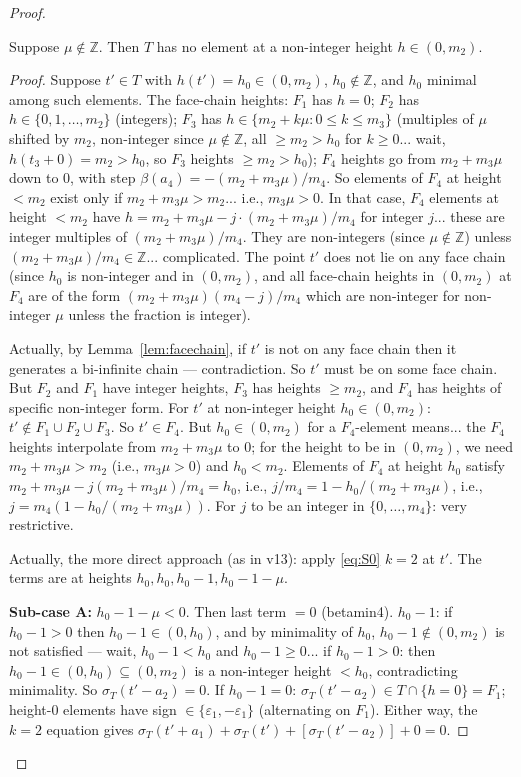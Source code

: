 \begin{proof}
\begin{lemma}[nogaps]\label{lem:nogaps}
Suppose $\mu \notin \mathbb{Z}$. Then $T$ has no element at a non-integer height $h \in (0, m_2)$.
\end{lemma}
\begin{proof}
Suppose $t' \in T$ with $h(t') = h_0 \in (0,m_2)$, $h_0 \notin \mathbb{Z}$, and $h_0$ minimal among such elements. The face-chain heights: $F_1$ has $h=0$; $F_2$ has $h \in \{0,1,\ldots,m_2\}$ (integers); $F_3$ has $h \in \{m_2+k\mu : 0 \leq k \leq m_3\}$ (multiples of $\mu$ shifted by $m_2$, non-integer since $\mu \notin \mathbb{Z}$, all $\geq m_2 > h_0$ for $k \geq 0$... wait, $h(t_3+0)=m_2>h_0$, so $F_3$ heights $\geq m_2 > h_0$); $F_4$ heights go from $m_2+m_3\mu$ down to $0$, with step $\beta(a_4) = -(m_2+m_3\mu)/m_4$. So elements of $F_4$ at height $< m_2$ exist only if $m_2+m_3\mu > m_2$... i.e., $m_3\mu > 0$. In that case, $F_4$ elements at height $< m_2$ have $h = m_2+m_3\mu - j \cdot (m_2+m_3\mu)/m_4$ for integer $j$... these are integer multiples of $(m_2+m_3\mu)/m_4$. They are non-integers (since $\mu \notin \mathbb{Z}$) unless $(m_2+m_3\mu)/m_4 \in \mathbb{Z}$... complicated. The point $t'$ does not lie on any face chain (since $h_0$ is non-integer and in $(0,m_2)$, and all face-chain heights in $(0,m_2)$ at $F_4$ are of the form $(m_2+m_3\mu)(m_4-j)/m_4$ which are non-integer for non-integer $\mu$ unless the fraction is integer).

Actually, by Lemma~\ref{lem:facechain}, if $t'$ is not on any face chain then it generates a bi-infinite chain — contradiction. So $t'$ must be on some face chain. But $F_2$ and $F_1$ have integer heights, $F_3$ has heights $\geq m_2$, and $F_4$ has heights of specific non-integer form. For $t'$ at non-integer height $h_0 \in (0,m_2)$: $t' \notin F_1 \cup F_2 \cup F_3$. So $t' \in F_4$. But $h_0 \in (0,m_2)$ for a $F_4$-element means... the $F_4$ heights interpolate from $m_2+m_3\mu$ to $0$; for the height to be in $(0,m_2)$, we need $m_2+m_3\mu > m_2$ (i.e., $m_3\mu > 0$) and $h_0 < m_2$. Elements of $F_4$ at height $h_0$ satisfy $m_2+m_3\mu - j(m_2+m_3\mu)/m_4 = h_0$, i.e., $j/m_4 = 1-h_0/(m_2+m_3\mu)$, i.e., $j = m_4(1-h_0/(m_2+m_3\mu))$. For $j$ to be an integer in $\{0,\ldots,m_4\}$: very restrictive.

Actually, the more direct approach (as in v13): apply \eqref{eq:S0} $k=2$ at $t'$. The terms are at heights $h_0, h_0, h_0-1, h_0-1-\mu$.

\textbf{Sub-case A:} $h_0-1-\mu < 0$. Then last term $= 0$ (betamin4). $h_0-1$: if $h_0-1 > 0$ then $h_0-1 \in (0,h_0)$, and by minimality of $h_0$, $h_0-1 \notin (0,m_2)$ is not satisfied — wait, $h_0-1 < h_0$ and $h_0-1 \geq 0$... if $h_0-1 > 0$: then $h_0-1 \in (0,h_0) \subseteq (0,m_2)$ is a non-integer height $< h_0$, contradicting minimality. So $\sigma_T(t'-a_2)=0$. If $h_0-1=0$: $\sigma_T(t'-a_2) \in T\cap\{h=0\}=F_1$; height-0 elements have sign $\in \{\varepsilon_1,-\varepsilon_1\}$ (alternating on $F_1$). Either way, the $k=2$ equation gives $\sigma_T(t'+a_1)+\sigma_T(t')+[\sigma_T(t'-a_2)]+0=0$.


\end{proof}
\end{proof}
